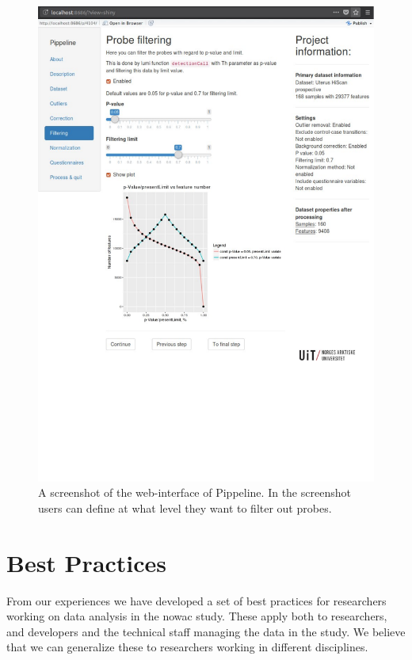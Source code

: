 \begin{figure}
    \includegraphics[width=\linewidth]{figures/scr_filtering.pdf}
  \caption{A screenshot of the web-interface of Pippeline. In the screenshot
    users can define at what level they want to filter out probes.}
  \label{fig:scr_filtering}
\end{figure}

\section{Best Practices} 
From our experiences we have developed a set of best practices for researchers
working on data analysis in the \gls{nowac} study. These apply both to
researchers, and developers and the technical staff managing the data in the
study. We believe that we can generalize these to researchers working in
different disciplines. 

